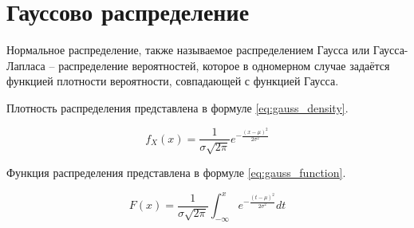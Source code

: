 \section{Гауссово распределение}

Нормальное распределение, также называемое распределением Гаусса или Гаусса-Лапласа -- распределение вероятностей, которое в одномерном случае задаётся функцией плотности вероятности, совпадающей с функцией Гаусса.

Плотность распределения представлена в формуле \ref{eq:gauss_density}.

\begin{equation}\label{eq:gauss_density}
    f_X (x) = \frac{1}{\sigma \sqrt{2 \pi}} e^{-\frac{(x - \mu)^2}{2 \sigma^2}}
\end{equation}

Функция распределения представлена в формуле \ref{eq:gauss_function}.

\begin{equation}\label{eq:gauss_function}
    F (x) = \frac{1}{\sigma \sqrt{2\pi}} \int_{-\infty}^x e^{-\frac{(t- \mu)^2}{2 \sigma^2}} dt
\end{equation}
